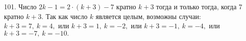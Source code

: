 101. Число $2k-1=2\cdot(k+3)-7$ кратно $k+3$ тогда и только тогда, когда 7 кратно $k+3.$ Так как число $k$ является целым, возможны случаи: $k+3=7,\ k=4,$ или $k+3=1,\ k=-2,$ или $k+3=-1,\ k=-4,$ или $k+3=-7,\ k=-10.$\\
